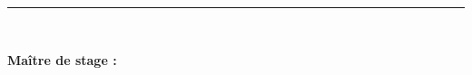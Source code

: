 \begin{titlepage}
\vfill

\rule{\textwidth}{0.4pt}

\vspace{8pt}
\begin{minipage}[t]{0.49\textwidth}
  \bfseries \pgeentreprise\\[3pt]
  \mdseries \pgeville
\end{minipage}\hfill
\begin{minipage}[t]{0.49\textwidth}
  \raggedleft\bfseries Maître de stage : \pgemaitre\\[3pt]
  \mdseries \pgedates
\end{minipage}

\end{titlepage}

\restoregeometry
